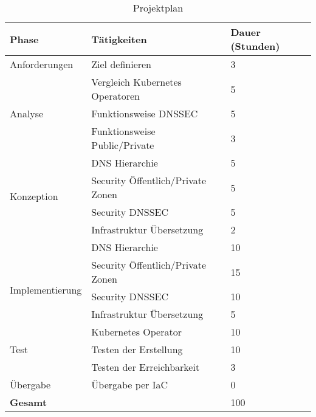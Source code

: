 \begin{table}[h]
  \myfloatalign
  \begin{tabular}{ |p{3cm}|p{6cm}|p{3cm}| }
      \hline
      \textbf{Phase}                    &      \textbf{Tätigkeiten}                 &    \textbf{Dauer (Stunden)} \\
      \hline
      \hline
      Anforderungen                     &      Ziel definieren                      &    3               \\
      \hline
      \multirow{3}{*}{Analyse}          &      Vergleich Kubernetes Operatoren      &    5               \\
                                        &      Funktionsweise DNSSEC                &    5               \\
                                        &      Funktionsweise Public/Private        &    3               \\
      \hline
      \multirow{4}{*}{Konzeption}       &      DNS Hierarchie                       &    5               \\
                                        &      Security Öffentlich/Private Zonen    &    5               \\
                                        &      Security DNSSEC                      &    5               \\
                                        &      Infrastruktur Übersetzung            &    2               \\
      \hline
      \multirow{5}{*}{Implementierung}  &      DNS Hierarchie                       &    10              \\
                                        &      Security Öffentlich/Private Zonen    &    15              \\
                                        &      Security DNSSEC                      &    10              \\
                                        &      Infrastruktur Übersetzung            &    5               \\
                                        &      Kubernetes Operator                  &    10              \\
      \hline
      Test                              &      Testen der Erstellung                &    10              \\
                                        &      Testen der Erreichbarkeit            &    3               \\
      \hline
      Übergabe                          &      Übergabe per IaC                     &    0               \\
      \hline
      \hline
      \textbf{Gesamt}                   &                                           &    100             \\
      \hline
  \end{tabular}
  \caption[Projektplan]{Projektplan}
  \label{subsec:description:plan:table}
\end{table}

